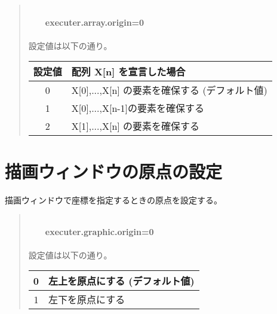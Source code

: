 \documentclass[10pt,a4j]{jarticle}
\begin{document}
\begin{quotation}
\noindent [使用例]\\
~~~~{\bf{executer.array.origin=0}}\\
\ \\ 
設定値は以下の通り。\\

\begin{tabular}{c|l}
\hline
設定値  & 配列 X[n] を宣言した場合 \\
\hline
0       & X[0],...,X[n]  の要素を確保する (デフォルト値) \\
\hline
1       & X[0],...,X[n-1]の要素を確保する \\
\hline
2       & X[1],...,X[n]  の要素を確保する \\
\hline
\end{tabular}


\end{quotation}

\section{描画ウィンドウの原点の設定}

描画ウィンドウで座標を指定するときの原点を設定する。

\begin{quotation}
\noindent [使用例]\\
~~~~{\bf{executer.graphic.origin=0}}\\
\ \\
設定値は以下の通り。\\

\begin{tabular}{c|l}
\hline
0 & 左上を原点にする (デフォルト値) \\
\hline
1 & 左下を原点にする \\
\hline
\end{tabular}
\end{quotation}

\end{document}
